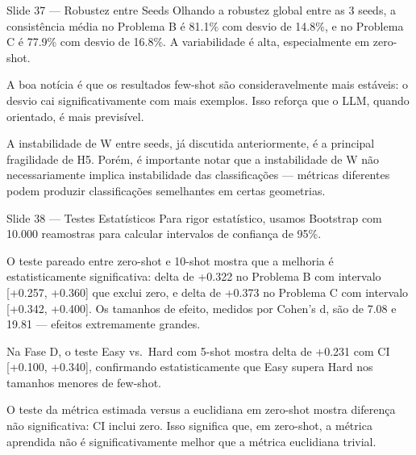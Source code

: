\documentclass[aspectratio=169,11pt]{beamer}
\begin{document}
\begin{frame}{Slide 37 --- Robustez entre Seeds}
\small
Olhando a robustez global entre as 3 seeds, a consistência média no Problema B é 81.1\% com desvio de 14.8\%, e no Problema C é 77.9\% com desvio de 16.8\%. A variabilidade é alta, especialmente em zero-shot.

A boa notícia é que os resultados few-shot são consideravelmente mais estáveis: o desvio cai significativamente com mais exemplos. Isso reforça que o LLM, quando orientado, é mais previsível.

A instabilidade de W entre seeds, já discutida anteriormente, é a principal fragilidade de H5. Porém, é importante notar que a instabilidade de W não necessariamente implica instabilidade das classificações --- métricas diferentes podem produzir classificações semelhantes em certas geometrias.
\end{frame}

\begin{frame}{Slide 38 --- Testes Estatísticos}
\small
Para rigor estatístico, usamos Bootstrap com 10.000 reamostras para calcular intervalos de confiança de 95\%.

O teste pareado entre zero-shot e 10-shot mostra que a melhoria é estatisticamente significativa: delta de +0.322 no Problema B com intervalo [+0.257, +0.360] que exclui zero, e delta de +0.373 no Problema C com intervalo [+0.342, +0.400]. Os tamanhos de efeito, medidos por Cohen's d, são de 7.08 e 19.81 --- efeitos extremamente grandes.

Na Fase D, o teste Easy vs.\ Hard com 5-shot mostra delta de +0.231 com CI [+0.100, +0.340], confirmando estatisticamente que Easy supera Hard nos tamanhos menores de few-shot.

O teste da métrica estimada versus a euclidiana em zero-shot mostra diferença não significativa: CI inclui zero. Isso significa que, em zero-shot, a métrica aprendida não é significativamente melhor que a métrica euclidiana trivial.
\end{frame}
\end{document}
